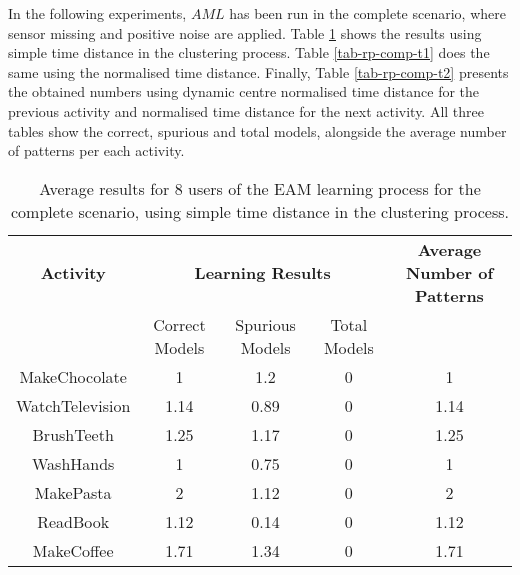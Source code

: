In the following experiments, $AML$ has been run in the complete scenario, where sensor missing and positive noise are applied. Table \ref{tab-rp-comp-t0} shows the results using simple time distance in the clustering process. Table \ref{tab-rp-comp-t1} does the same using the normalised time distance. Finally, Table \ref{tab-rp-comp-t2} presents the obtained numbers using dynamic centre normalised time distance for the previous activity and normalised time distance for the next activity. All three tables show the correct, spurious and total models, alongside the average number of patterns per each activity.

\begin{table}[htbp]\scriptsize
  \begin{center}
        \begin{tabular}{ccccc}
            \hline            
            \textbf{Activity} & \multicolumn{3}{c}{\textbf{Learning Results}} & \textbf{Average Number of Patterns} \\
             & Correct Models & Spurious Models & Total Models & \\
            \hline
            MakeChocolate   & 1    & 1.2   & 0 & 1 \\
	    WatchTelevision & 1.14 & 0.89  & 0 & 1.14 \\
	    BrushTeeth      & 1.25 & 1.17  & 0 & 1.25 \\
	    WashHands       & 1    & 0.75  & 0 & 1 \\
	    MakePasta       & 2    & 1.12  & 0 & 2 \\
	    ReadBook        & 1.12 & 0.14  & 0 & 1.12 \\
	    MakeCoffee      & 1.71 & 1.34  & 0 & 1.71 \\
            \hline
        \end{tabular}                
        \caption{Average results for 8 users of the EAM learning process for the complete scenario, using simple time distance in the clustering process.}
        \label{tab-rp-comp-t0}
    \end{center}
\end{table}

